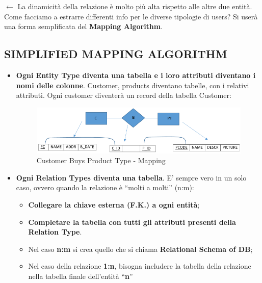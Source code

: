 $\leftarrow$ La dinamicità della relazione è molto più alta rispetto alle altre due entità. Come facciamo a estrarre differenti info per le diverse tipologie di users? Si userà una forma semplificata del \textbf{Mapping Algorithm}.

\subsection{SIMPLIFIED MAPPING ALGORITHM}

\begin{itemize}

\item \textbf{Ogni Entity Type diventa una tabella e i loro attributi diventano i nomi delle colonne}. Customer, products diventano tabelle, con i relativi attributi. Ogni customer diventerà un record della tabella Customer:

\begin{center}
\begin{figure}[H]
\centering
\includegraphics[scale=0.8]{figures/cbuypt_mapping.png}
\caption{Customer Buys Product Type - Mapping} 
\end{figure}
\end{center}

\item \textbf{Ogni Relation Types diventa una tabella}. E’ sempre vero in un solo caso, ovvero quando la relazione è “molti a molti” (n:m):

\begin{itemize}

\item \textbf{Collegare la chiave esterna (F.K.) a ogni entità};
\item \textbf{Completare la tabella con tutti gli attributi presenti della Relation Type}.

\end{itemize}

\begin{itemize}

\item Nel caso \textbf{n:m} si crea quello che si chiama \textbf{Relational Schema of DB};

\item Nel caso della relazione \textbf{1:n}, bisogna includere la tabella della relazione nella tabella finale  dell’entità “\textbf{n}” 


\end{itemize}
\end{itemize}
